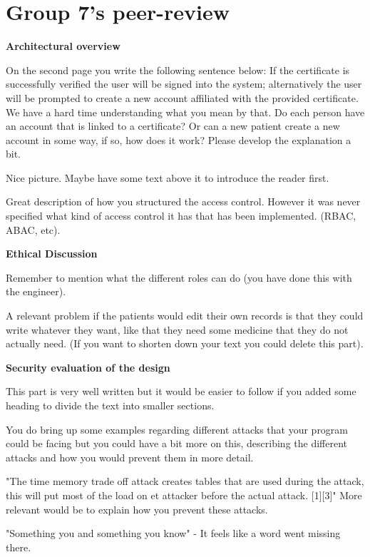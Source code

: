 \documentclass{article}
\begin{document}
\section*{Group 7's peer-review}

\textbf{Architectural overview}

On the second page you write the following sentence below: \newline
If the certificate is successfully verified the user will be signed into the system; alternatively the user will be prompted to create a new account affiliated with the provided certificate.
We have a hard time understanding what you mean by that. Do each person have an account that is linked to a certificate? Or can a new patient create a new account in some way, if so, how does it work? Please develop the explanation a bit. 

Nice picture. Maybe have some text above it to introduce the reader first.

Great description of how you structured the access control. However it was never specified what kind of access control it has that has been implemented. (RBAC, ABAC, etc).

\textbf{Ethical Discussion}

Remember to mention what the different roles can do (you have done this with the engineer).

A relevant problem if the patients would edit their own records is that they could write whatever they want, like that they need some medicine that they do not actually need. (If you want to shorten down your text you could delete this part).

\textbf{Security evaluation of the design}

This part is very well written but it would be easier to follow if you added some heading to divide the text into smaller sections. 

You do bring up some examples regarding different attacks that your program could be facing but you could have a bit more on this, describing the different attacks and how you would prevent them in more detail.

"The time memory trade off attack creates tables that are used during the attack, this will put most of the load on et attacker before the actual attack. [1][3]" More relevant would be to explain how you prevent these attacks.

"Something you and something you know" - It feels like a word went missing there.  
\end{document}
